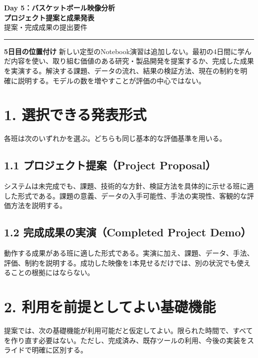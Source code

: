 \documentclass[11pt,a4paper]{article}
\begin{document}
\begin{center}
  {\LARGE\bfseries Day 5：バスケットボール映像分析\\プロジェクト提案と成果発表}\\[5pt]
  {\large 提案・完成成果の提出要件}\\[8pt]
  \rule{0.92\textwidth}{0.6pt}
\end{center}

\begin{tcolorbox}[colback=Soft,colframe=Rule,arc=1mm,boxrule=0.5pt]
\textbf{5日目の位置付け}\quad
新しい定型のNotebook演習は追加しない。最初の4日間に学んだ内容を使い、取り組む価値のある研究・製品開発を提案するか、完成した成果を実演する。解決する課題、データの流れ、結果の検証方法、現在の制約を明確に説明する。モデルの数を増やすことが評価の中心ではない。
\end{tcolorbox}

\section{1. 選択できる発表形式}

各班は次のいずれかを選ぶ。どちらも同じ基本的な評価基準を用いる。

\subsection{1.1 プロジェクト提案（Project Proposal）}

システムは未完成でも、課題、技術的な方針、検証方法を具体的に示せる班に適した形式である。課題の意義、データの入手可能性、手法の実現性、客観的な評価方法を説明する。

\subsection{1.2 完成成果の実演（Completed Project Demo）}

動作する成果がある班に適した形式である。実演に加え、課題、データ、手法、評価、制約を説明する。成功した映像を1本見せるだけでは、別の状況でも使えることの根拠にはならない。

\section{2. 利用を前提としてよい基礎機能}

提案では、次の基礎機能が利用可能だと仮定してよい。限られた時間で、すべてを作り直す必要はない。ただし、完成済み、既存ツールの利用、今後の実装をスライドで明確に区別する。
\end{document}
